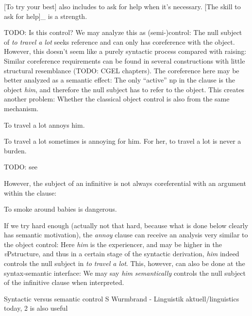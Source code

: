 \documentclass[UTF8, a4paper, oneside, scheme=plain]{ctexrep}
\newcommand*{\citepage}[1]{p.~{#1}}
\newcommand{\corpus}[1]{\emph{#1}}
\newcommand{\vP}{\textit{v}P}
\begin{document}
\begin{exe}
    \ex\label{ex:complement.infinitive.1} 
    [To try your best] also includes to ask for help when it's necessary.
    \ex\label{ex:complement.infinitive.1p} [The skill to ask for help]_{}
    is a strength.
\end{exe}

TODO: Is this control?
We may analyze this as (semi-)control:
The null subject of \corpus{to travel a lot} 
seeks reference and can only has coreference with the object.
However, this doesn't seem like a purely syntactic process
compared with raising:
Similar coreference requirements can be found in 
several constructions with little structural resemblance
(TODO: CGEL chapters).
The coreference here may be better analyzed as a semantic effect:
The only ``active'' \acs{np} in the clause is the object \corpus{him},
and therefore the null subject has to refer to the object.
This creates another problem: 
Whether the classical object control is also from the same mechanism.

\begin{exe}
    \ex To travel a lot annoys him.
\end{exe}
\begin{exe}
    \ex To travel a lot sometimes is annoying for him.
    \ex For her, to travel a lot is never a burden.
\end{exe}

TODO: see \citet[\citepage{1269}]{cgel}

However, the subject of an infinitive is not always coreferential with an argument within the clause:
\begin{exe}
    \ex To smoke around babies is dangerous.
\end{exe} 

If we try hard enough
(actually not that hard, because what is done below clearly has semantic motivation), 
the \corpus{annoy} clause can receive an analysis very similar to the object control:
Here \corpus{him} is the experiencer, 
and may be higher in the \vP structure, 
and thus in a certain stage of the syntactic derivation,
\corpus{him} indeed controls the null subject in \corpus{to travel a lot}.
This, however, can also be done at the syntax-semantic interface: 
We may say \corpus{him} \emph{semantically} controls 
the null subject of the infinitive clause
when interpreted.

Syntactic versus semantic control
S Wurmbrand - Linguistik aktuell/linguistics today, 2 is also useful
\end{document}
